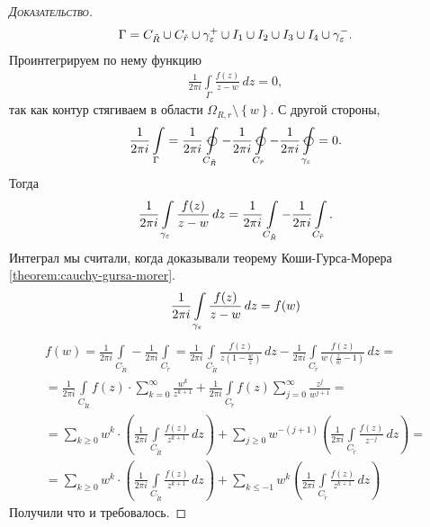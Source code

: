 \documentclass[../../main.tex]{subfiles}
\begin{document}
\begin{proof}[\normalfont\textsc{Доказательство}]
 \begin{align*}
  \Gamma = C_{\tilde R} \cup C_{\tilde r} \cup \gamma_\varepsilon^{+} \cup I_1 \cup I_2 \cup I_3 \cup I_4 \cup \gamma_\varepsilon^{-}.
 \end{align*} Проинтегрируем по нему функцию
 \begin{align*}
  \frac{1}{2\pi i} \int\limits_{\Gamma} \frac{f(z)}{z - w}  \, dz = 0,
 \end{align*} так как контур стягиваем в области $ \Omega_{R,r} \setminus \left\{ w \right\} $. С другой стороны,
 \begin{align*}
  \frac{1}{2\pi i} \int\limits_{\Gamma} = \frac{1}{2\pi i} \varointctrclockwise \limits_{C_{\tilde R}}   - \frac{1}{2\pi i} \varointctrclockwise\limits_{C_{\tilde r}}  - \frac{1}{2\pi i} \varointctrclockwise\limits_{\gamma_\eps}   = 0.
 \end{align*} Тогда
 \begin{align*}
  \frac{1}{2\pi i} \int\limits_{\gamma_\varepsilon} \frac{f(z)}{z-w}\,dz = \frac{1}{2\pi i} \int\limits_{C_{\tilde R}}   - \frac{1}{2\pi i}\int\limits_{C_{\tilde r}}.
\end{align*} Интеграл мы считали, когда доказывали теорему Коши-Гурса-Морера \eqref{theorem:cauchy-gursa-morer}.
 \begin{align*}
  \frac{1}{2\pi i} \int\limits_{\gamma_\varepsilon}   \frac{f(z)}{z-w}\,dz = f(w)
 \end{align*}
 \begin{align*}
  f(w) = \frac{1}{2\pi i} \int\limits_{C_{\tilde R}}   - \frac{1}{2\pi i} \int\limits_{C_{\tilde r}}  = \frac{1}{2\pi i} \int\limits_{C_{\tilde R}}   \frac{f(z)}{z(1 - \frac{w}{z})}\,dz - \frac{1}{2\pi i} \int\limits_{C_{\tilde r}}   \frac{f(z)}{w(\frac{z}{w}-1)}\,dz = \\
  = \frac{1}{2\pi i}  \int\limits_{C_{\tilde R}} f(z) \cdot \sum_{k=0}^{\infty} \frac{w^{k}}{z^{k+1}}   + \frac{1}{2\pi i} \int\limits_{C_{\tilde r}}  f(z) \sum_{j=0}^{\infty}\frac{z^{j}}{w^{j+1}} = \\
  = \sum_{k \geqslant 0} w^{k} \cdot \left(\frac{1}{2\pi i} \int\limits_{C_{\tilde R}}   \frac{f(z)}{z^{k+1}}\,dz \right) + \sum_{j \geqslant 0} w^{-(j+1)} \left( \frac{1}{2\pi i} \int\limits_{C_{\tilde r}} \frac{f(z)}{z^{-j}}\,dz   \right) = \\
  = \sum_{k \geqslant 0} w^{k} \cdot \left(\frac{1}{2\pi i} \int\limits_{C_{\tilde R}}   \frac{f(z)}{z^{k+1}}\,dz \right) + \sum_{k \leqslant -1} w^{k} \left( \frac{1}{2\pi i} \int\limits_{C_{\tilde r}} \frac{f(z)}{z^{k + 1}}\,dz   \right)
 \end{align*} Получили что и требовалось.


\end{proof}
\end{document}
